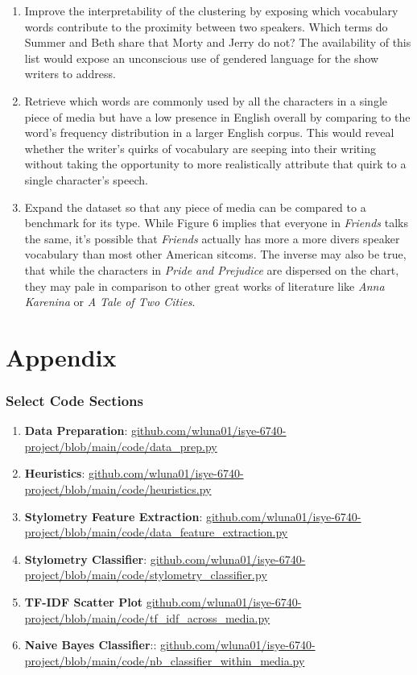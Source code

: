\documentclass{article}
\begin{document}
\begin{titlepage}
\begin{enumerate}
\item Improve the interpretability of the clustering by exposing which vocabulary words contribute to the proximity between two speakers. Which terms do Summer and Beth share that Morty and Jerry do not? The availability of this list would expose an unconscious use of gendered language for the show writers to address.
\item Retrieve which words are commonly used by all the characters in a single piece of media but have a low presence in English overall by comparing to the word's frequency distribution in a larger English corpus. This would reveal whether the writer's quirks of vocabulary are seeping into their writing without taking the opportunity to more realistically attribute that quirk to a single character's speech.
\item Expand the dataset so that any piece of media can be compared to a benchmark for its type. While Figure 6 implies that everyone in \textit{Friends} talks the same, it's possible that \textit{Friends} actually has more a more divers speaker vocabulary than most other American sitcoms. The inverse may also be true, that while the characters in \textit{Pride and Prejudice} are dispersed on the chart, they may pale in comparison to other great works of literature like \textit{Anna Karenina} or \textit{A Tale of Two Cities}.
\end{enumerate}

\begin{enumerate}

\end{enumerate}

\section{Appendix}
\subsubsection{Select Code Sections}

\begin{enumerate}
\item \textbf{Data Preparation}: \url{github.com/wluna01/isye-6740-project/blob/main/code/data_prep.py}
\item \textbf{Heuristics}: \url{github.com/wluna01/isye-6740-project/blob/main/code/heuristics.py}
\item \textbf{Stylometry Feature Extraction}: \url{github.com/wluna01/isye-6740-project/blob/main/code/data_feature_extraction.py}
\item \textbf{Stylometry Classifier}: \url{github.com/wluna01/isye-6740-project/blob/main/code/stylometry_classifier.py}
\item \textbf{TF-IDF Scatter Plot} \url{github.com/wluna01/isye-6740-project/blob/main/code/tf_idf_across_media.py}
\item \textbf{Naive Bayes Classifier}:: \url{github.com/wluna01/isye-6740-project/blob/main/code/nb_classifier_within_media.py}
\end{enumerate}


\end{titlepage}
\end{document}
